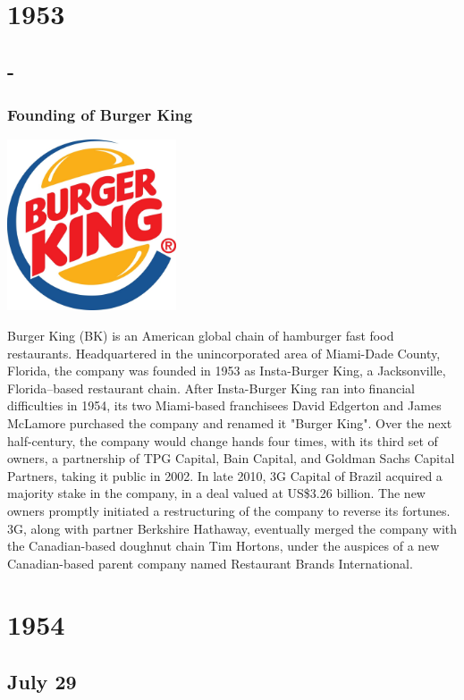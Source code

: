 \documentclass[11pt]{report}
\begin{document}
\chapter{1953}
\section{-}
\subsection{Founding of Burger King}
\vspace{2mm}\begin{center}\includegraphics[width=5cm]{./img/burgerKingLogo.jpg}\end{center}
Burger King (BK) is an American global chain of hamburger fast food restaurants. Headquartered in the unincorporated area of Miami-Dade County, Florida, the company was founded in 1953 as Insta-Burger King, a Jacksonville, Florida–based restaurant chain. After Insta-Burger King ran into financial difficulties in 1954, its two Miami-based franchisees David Edgerton and James McLamore purchased the company and renamed it "Burger King". Over the next half-century, the company would change hands four times, with its third set of owners, a partnership of TPG Capital, Bain Capital, and Goldman Sachs Capital Partners, taking it public in 2002. In late 2010, 3G Capital of Brazil acquired a majority stake in the company, in a deal valued at US\$3.26 billion. The new owners promptly initiated a restructuring of the company to reverse its fortunes. 3G, along with partner Berkshire Hathaway, eventually merged the company with the Canadian-based doughnut chain Tim Hortons, under the auspices of a new Canadian-based parent company named Restaurant Brands International.

\chapter{1954}
\section{July 29}
\end{document}
